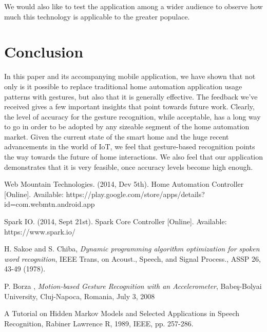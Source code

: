 \documentclass[journal]{IEEEtran}
\begin{document}
We would also like to test the application among a wider audience to observe how much this technology is applicable to the greater populace.
\section{Conclusion}

In this paper and its accompanying mobile application, we have shown that not only is it possible to replace traditional home automation application usage patterns with gestures, but also that it is generally effective. The feedback we’ve received gives a few important insights that point towards future work. Clearly, the level of accuracy for the gesture recognition, while acceptable, has a long way to go in order to be adopted by any sizeable segment of the home automation market. Given the current state of the smart home and the huge recent advancements in the world of IoT, we feel that gesture-based recognition points the way towards the future of home interactions. We also feel that our application demonstrates that it is very feasible, once accuracy levels become high enough. 


\raggedright
\begin{thebibliography}{1}

Web Mountain Technologies. (2014, Dev 5th). Home Automation Controller [Online]. Available: https://play.google.com/store/apps/details?id=com.webmtn.android.app


Spark IO. (2014, Sept 21st). Spark Core Controller [Online]. Available: https://www.spark.io/


H. Sakoe and S. Chiba, \emph{Dynamic programming algorithm optimization for spoken word recognition}, IEEE Trans, on Acoust., Speech, and Signal Process., ASSP 26, 43-49 (1978).

P. Borza , \emph{Motion-based Gesture Recognition with an Accelerometer}, Babe\c{s}-Bolyai University, Cluj-Napoca, Romania, July 3, 2008



A Tutorial on Hidden Markov Models and Selected Applications in Speech Recognition, Rabiner Lawrence R, 1989, IEEE, pp. 257-286.



\end{thebibliography}
\end{document}

